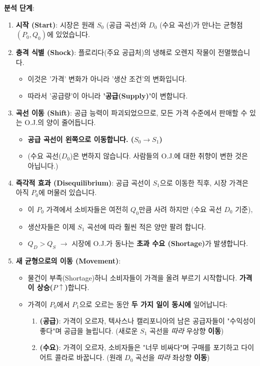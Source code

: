 \documentclass[11pt,a4paper]{book}
\theoremstyle{definition}
\begin{document}
\textbf{분석 단계}:

\begin{enumerate}
    \item \textbf{시작 (Start)}: 시장은 원래 $S_0$ (공급 곡선)와 $D_0$ (수요 곡선)가 만나는 균형점 $(P_0, Q_0)$에 있었습니다.

    \item \textbf{충격 식별 (Shock)}: 플로리다(주요 공급처)의 냉해로 오렌지 작물이 전멸했습니다.
        \begin{itemize}
            \item 이것은 '가격' 변화가 아니라 '생산 조건'의 변화입니다.
            \item 따라서 '공급량'이 아니라 \textbf{'공급(Supply)'}이 변합니다.
        \end{itemize}

    \item \textbf{곡선 이동 (Shift)}: 공급 능력이 파괴되었으므로, 모든 가격 수준에서 판매할 수 있는 O.J.의 양이 줄어듭니다.
        \begin{itemize}
            \item \textbf{공급 곡선이 왼쪽으로 이동합니다. ($S_0 \rightarrow S_1$)}
            \item (수요 곡선($D_0$)은 변하지 않습니다. 사람들의 O.J.에 대한 취향이 변한 것은 아닙니다.)
        \end{itemize}

    \item \textbf{즉각적 효과 (Disequilibrium)}: 공급 곡선이 $S_1$으로 이동한 직후, 시장 가격은 아직 $P_0$에 머물러 있습니다.
        \begin{itemize}
            \item 이 $P_0$ 가격에서 소비자들은 여전히 $Q_0$만큼 사려 하지만 (수요 곡선 $D_0$ 기준),
            \item 생산자들은 이제 $S_1$ 곡선에 따라 훨씬 적은 양만 팔려 합니다.
            \item $Q_D > Q_S$ $\rightarrow$ 시장에 O.J.가 동나는 \textbf{초과 수요 (Shortage)}가 발생합니다.
        \end{itemize}

    \item \textbf{새 균형으로의 이동 (Movement)}:
        \begin{itemize}
            \item 물건이 부족(Shortage)하니 소비자들이 가격을 올려 부르기 시작합니다. \textbf{가격이 상승($P \uparrow$)}합니다.
            \item 가격이 $P_0$에서 $P_1$으로 오르는 동안 \textbf{두 가지 일이 동시에} 일어납니다:
                \begin{enumerate}
                    \item \textbf{(공급)}: 가격이 오르자, 텍사스나 캘리포니아의 남은 공급자들이 "수익성이 좋다"며 공급을 늘립니다. (새로운 $S_1$ 곡선을 \textit{따라} 우상향 \textbf{이동})
                    \item \textbf{(수요)}: 가격이 오르자, 소비자들은 "너무 비싸다"며 구매를 포기하고 다이어트 콜라로 바꿉니다. (원래 $D_0$ 곡선을 \textit{따라} 좌상향 \textbf{이동})
                \end{enumerate}
        \end{itemize}


\end{enumerate}
\end{document}
